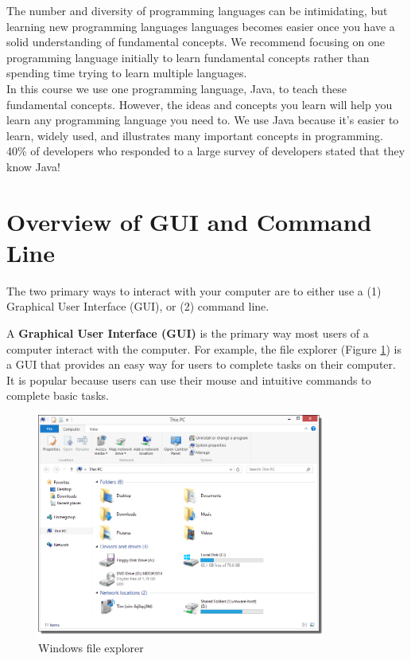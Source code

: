 The number and diversity of programming languages can be intimidating, but learning new programming languages languages becomes easier once you have a solid understanding of fundamental concepts. 
We recommend focusing on one programming language initially to learn fundamental concepts rather than spending time trying to learn multiple languages. \\

In this course we use one programming language, Java, to teach these fundamental concepts.
However, the ideas and concepts you learn will help you learn any programming language you need to. 
We use Java because it’s easier to learn, widely used, and illustrates many important concepts in programming. 40\% of developers who responded to a large survey of developers stated that they know Java! \\

\section{Overview of GUI and Command Line}

The two primary ways to interact with your computer are to either use a (1) Graphical User Interface (GUI), or (2) command line.

A \textbf{Graphical User Interface (GUI)} is the primary way most users of a computer interact with the computer. For example, the file explorer (Figure \ref{fig:windows:file}) is a GUI that provides an easy way for users to complete tasks on their computer. It is popular because users can use their mouse and intuitive commands to complete basic tasks. \\

\begin{figure}
	\centering
	\includegraphics[width=0.85\textwidth]{images/windowsGUI.png}
	\caption{Windows file explorer}
	\label{fig:windows:file}
\end{figure}

